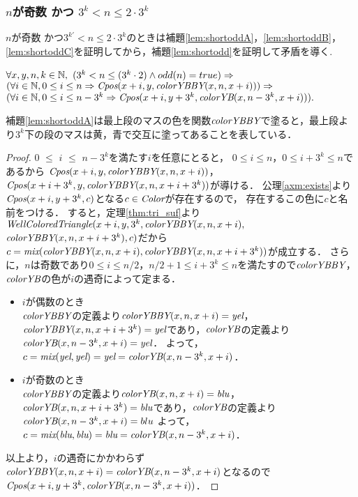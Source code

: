 \subsubsection{$n$が奇数 かつ $3^{k} < n \leq 2 \cdot 3^{k}$}
$n$が奇数 かつ$3^{k'} < n \leq 2 \cdot 3^{k}$のときは補題\ref{lem:shortoddA}，\ref{lem:shortoddB}，\ref{lem:shortoddC}を証明してから，補題\ref{lem:shortodd}を証明して矛盾を導く.
\begin{lem}[\ShortOddA] \label{lem:shortoddA}
  $\forall x,y,n,k \in \mathbb{N},$
  $(3^k < n \leq (3^k\cdot2) \land odd(n) = true) \Rightarrow$
  $(\forall i \in \mathbb{N}, 0 \leq i \leq n \Rightarrow \textit{Cpos}(x+i,y,\textit{colorYBBY}(x,n,x+i))) \Rightarrow$
  $(\forall i \in \mathbb{N}, 0 \leq i \leq n - 3^k \Rightarrow \textit{Cpos}(x+i,y+3^k,\textit{colorYB}(x,n-3^k,x+i))).$
\end{lem}
補題\ref{lem:shortoddA}は最上段のマスの色を関数$\textit{colorYBBY}$で塗ると，最上段より$3^k$下の段のマスは黄，青で交互に塗ってあることを表している．
\begin{proof}
  $0$ $\leq$ $i$ $\leq$ $n-3^k$を満たす$i$を任意にとると，
  $0 \leq i \leq n$，$0 \leq i+3^k \leq n$であるから
  $\textit{Cpos}(x+i,y,\textit{colorYBBY}(x,n,x+i))$，$\textit{Cpos}(x+i+3^k,y,\textit{colorYBBY}(x,n,x+i+3^k))$が導ける．
  公理\ref{axm:exists}より$\textit{Cpos}(x+i,y+3^k,c)$となる$c\in\textit{Color}$が存在するので，
  存在するこの色に$c$と名前をつける．
  すると，定理\ref{thm:tri_suf}より$\textit{WellColoredTriangle}(x+i,y,3^k,\textit{colorYBBY}(x,n,x+i),$ $\textit{colorYBBY}(x,n,x+i+3^k),c)$だから$c=\textit{mix}(\textit{colorYBBY}(x,n,x+i),\textit{colorYBBY}(x,n,x+i+3^k))$が成立する．
  さらに，$n$は奇数であり$0 \leq i \leq n/2$，$n/2+1 \leq i+3^k \leq n$を満たすので$\textit{colorYBBY}$，$\textit{colorYB}$の色が$i$の遇奇によって定まる．
  \begin{itemize}
  \item
    $i$が偶数のとき \\
    $\textit{colorYBBY}$の定義より$\textit{colorYBBY}(x,n,x+i)=\textit{yel}$，$\textit{colorYBBY}(x,n,x+i+3^k)=\textit{yel}$であり，$\textit{colorYB}$の定義より$\textit{colorYB}(x,n-3^k,x+i)=\textit{yel}$．
    よって，$c=\textit{mix}(\textit{yel},\textit{yel})=\textit{yel}=\textit{colorYB}(x,n-3^k,x+i)$．
  \item
    $i$が奇数のとき \\
    $\textit{colorYBBY}$の定義より$\textit{colorYB}(x,n,x+i)=\textit{blu}$，$\textit{colorYB}(x,n,x+i+3^k)=\textit{blu}$であり，$\textit{colorYB}$の定義より$\textit{colorYB}(x,n-3^k,x+i)=blu$
    よって，$c=\textit{mix}(\textit{blu},\textit{blu})=\textit{blu}=\textit{colorYB}(x,n-3^k,x+i)$．
  \end{itemize}
  以上より，$i$の遇奇にかかわらず$\textit{colorYBBY}(x,n,x+i)=\textit{colorYB}(x,n-3^k,x+i)$となるので$\textit{Cpos}(x+i,y+3^k,\textit{colorYB}(x,n-3^k,x+i))$．
\end{proof}

